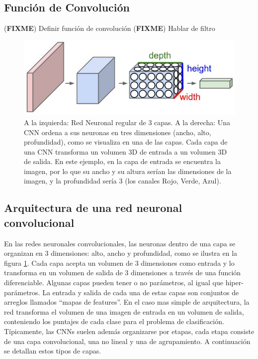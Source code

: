 \documentclass[a4paper,11pt,spanish]{book}
\newcommand*{\FIXME}[1]{{(\textbf{FIXME}) {#1}}}
\begin{document}
    \subsection{Función de Convolución}
      \FIXME{Definir función de convolución}
      \FIXME{Hablar de filtro}
    \begin{figure}[H]
      \begin{center}
       \includegraphics[width=0.8\linewidth]{./img/stanford_cnn.jpeg}
      \end{center}
      \caption{A la izquierda: Red Neuronal regular de 3 capas. A la derecha: Una CNN ordena a sus neuronas en tres dimensiones (ancho, alto, profundidad), como se visualiza en una de
	las capas. Cada capa de una CNN transforma un volumen 3D de entrada a un volumen 3D de salida. En este ejemplo, en la capa de entrada se encuentra la imagen, por lo que su ancho y su altura
	serían las dimensiones de la imagen, y la profundidad sería 3 (los canales Rojo, Verde, Azul). \cite{Karpathy:Stanford}}
      \label{fig:cnn}
    \end{figure}

    \subsection {Arquitectura de una red neuronal convolucional}
      En las redes neuronales convolucionales, las neuronas dentro de una capa se organizan en 3 dimensiones: alto, ancho y profundidad, como se ilustra en la figura \ref{fig:cnn}.
      Cada capa acepta un volumen de 3 dimensiones como entrada y lo transforma en un volumen de salida de 3 dimensiones a través de una función diferenciable.
      Algunas capas pueden tener o no parámetros, al igual que hiper-parámetros. La entrada y salida de cada una de estas capas son conjuntos de arreglos llamados “mapas de features”.
      En el caso mas simple de arquitectura, la red transforma el volumen de una imagen de entrada en un volumen de salida, conteniendo los puntajes de cada clase para el problema de clasificación.
      Típicamente, las CNNs suelen además organizarse por etapas, cada etapa consiste de una capa convolucional, una no lineal y una de agrupamiento.
      A continuación se detallan estos tipos de capas.
\end{document}
